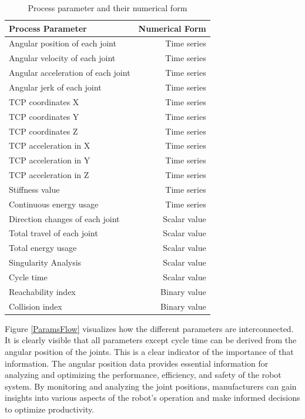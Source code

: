 \begin{table}[H]
	\centering
	\begin{tabular}{||l|r||}
		Process Parameter & Numerical Form\\
		\hline
		\hline
		\hline
		
		Angular position of each joint & Time series\\
		Angular velocity of each joint & Time series\\
		Angular acceleration of each joint& Time series\\
		Angular jerk of each joint& Time series\\
		\hline
		\hline	
		
		TCP coordinates X & Time series\\
		TCP coordinates Y & Time series\\
		TCP coordinates Z & Time series\\
		\hline
		\hline
		TCP acceleration in X & Time series\\
		TCP acceleration in Y & Time series\\
		TCP acceleration in Z & Time series\\
		\hline
		\hline
		Stiffness value & Time series\\
		
		
		Continuous energy usage & Time series\\
		\hline
		\hline
		Direction changes of each joint& Scalar value\\
		Total travel of each joint& Scalar value\\
		Total energy usage & Scalar value\\
		Singularity Analysis & Scalar value\\
		Cycle time & Scalar value\\
		\hline
		\hline
		Reachability index & Binary value\\
		Collision index & Binary value\\
		\hline
		\hline
		
	\end{tabular}
	
	
	\caption{Process parameter and their numerical form}
	\label{procesparameters}
\end{table}

Figure \ref{ParamsFlow} visualizes how the different parameters are interconnected. It is clearly visible that all parameters except cycle time can be derived from the angular position of the joints. This is a clear indicator of the importance of that information. The angular position data provides essential information for analyzing and optimizing the performance, efficiency, and safety of the robot system. By monitoring and analyzing the joint positions, manufacturers can gain insights into various aspects of the robot's operation and make informed decisions to optimize productivity.

